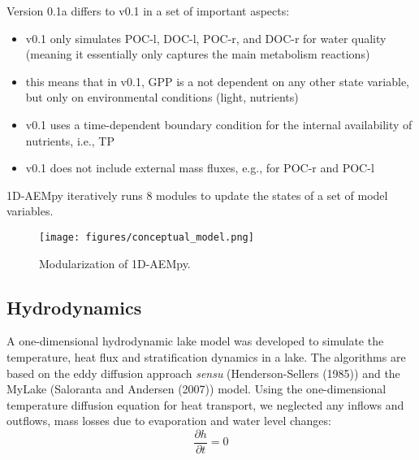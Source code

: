 \documentclass[
  letterpaper,
  DIV=11,
  numbers=noendperiod]{scrartcl}
\providecommand{\tightlist}{%
  \setlength{\itemsep}{0pt}\setlength{\parskip}{0pt}}\usepackage{longtable,booktabs,array}
\begin{document}
\begin{tcolorbox}[enhanced jigsaw, colframe=quarto-callout-note-color-frame, leftrule=.75mm, arc=.35mm, coltitle=black, titlerule=0mm, rightrule=.15mm, title=\textcolor{quarto-callout-note-color}{\faInfo}\hspace{0.5em}{Note}, colbacktitle=quarto-callout-note-color!10!white, bottomtitle=1mm, toprule=.15mm, colback=white, left=2mm, opacitybacktitle=0.6, breakable, toptitle=1mm, bottomrule=.15mm, opacityback=0]

Version 0.1a differs to v0.1 in a set of important aspects:

\begin{itemize}
\tightlist
\item
  v0.1 only simulates POC-l, DOC-l, POC-r, and DOC-r for water quality
  (meaning it essentially only captures the main metabolism reactions)
\item
  this means that in v0.1, GPP is a not dependent on any other state
  variable, but only on environmental conditions (light, nutrients)
\item
  v0.1 uses a time-dependent boundary condition for the internal
  availability of nutrients, i.e., TP
\item
  v0.1 does not include external mass fluxes, e.g., for POC-r and POC-l
\end{itemize}

\end{tcolorbox}

1D-AEMpy iteratively runs 8 modules to update the states of a set of
model variables.

\begin{figure}

{\centering \texttt{[image: figures/conceptual\_model.png]}

}

\caption{\label{fig-best_model}Modularization of 1D-AEMpy.}

\end{figure}

\hypertarget{hydrodynamics}{%
\subsection{Hydrodynamics}\label{hydrodynamics}}

A one-dimensional hydrodynamic lake model was developed to simulate the
temperature, heat flux and stratification dynamics in a lake. The
algorithms are based on the eddy diffusion approach \textit{sensu}
(Henderson-Sellers (1985)) and the MyLake (Saloranta and Andersen
(2007)) model. Using the one-dimensional temperature diffusion equation
for heat transport, we neglected any inflows and outflows, mass losses
due to evaporation and water level changes: \[
    \frac{\partial h}{\partial t}=0
\]
\end{document}
